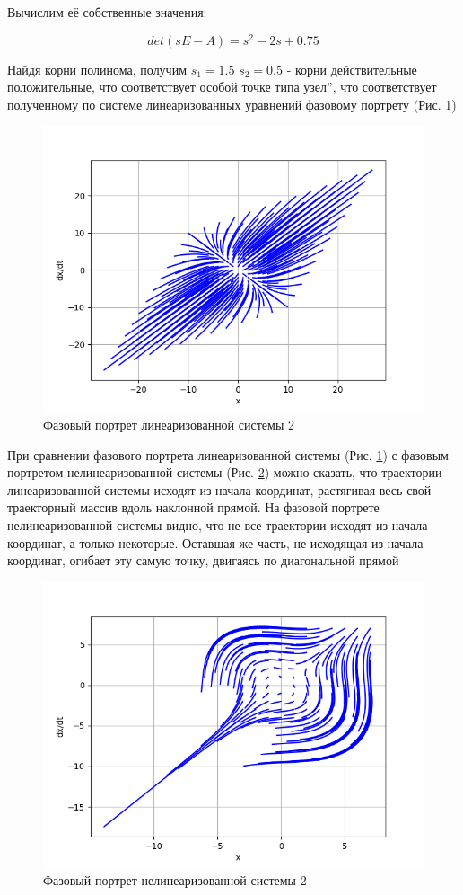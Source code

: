 Вычислим её собственные значения:

$$
det(sE - A) = s^2 - 2s + 0.75
$$

Найдя корни полинома, получим $s_1 = 1.5$ $s_2 = 0.5$ - корни действительные положительные, 
что соответствует особой точке типа  узел\textquotedblright, 
что соответствует полученному по системе линеаризованных уравнений фазовому портрету (Рис. \ref{fig:3})

\begin{figure}[H]
	\centering
	\includegraphics[width=0.6\linewidth]{body/images/Linearized-system-2.png}
	\caption{Фазовый портрет линеаризованной системы 2}
	\label{fig:3}
\end{figure}

При сравнении фазового портрета линеаризованной системы (Рис. \ref{fig:3}) с фазовым портретом нелинеаризованной системы
(Рис. \ref{fig:4}) можно сказать, что траектории линеаризованной системы исходят из начала координат, растягивая
весь свой траекторный массив вдоль наклонной прямой. На фазовой портрете нелинеаризованной системы видно,
что не все траектории исходят из начала координат, а только некоторые. Оставшая же часть, не исходящая из
начала координат, огибает эту самую точку, двигаясь по диагональной прямой

\begin{figure}[H]
	\centering
	\includegraphics[width=0.6\linewidth]{body/images/System-2.png}
	\caption{Фазовый портрет нелинеаризованной системы 2}
	\label{fig:4}
\end{figure}

